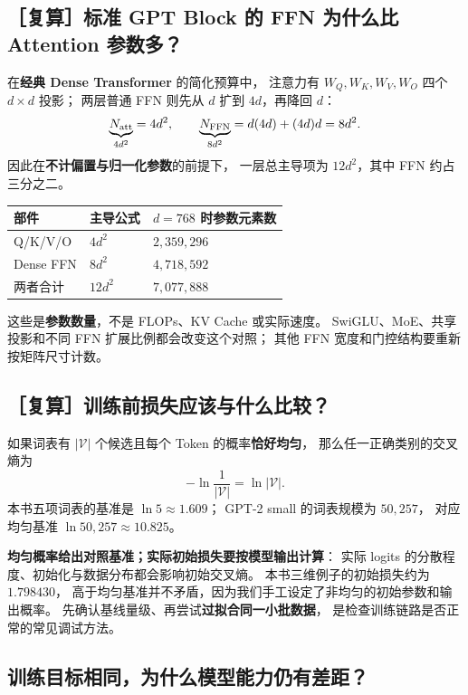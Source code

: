 \subsection{［复算］标准 GPT Block 的 FFN 为什么比 Attention 参数多？}

在\textbf{经典 Dense Transformer} 的简化预算中，
注意力有 $W_Q,W_K,W_V,W_O$ 四个 $d\times d$ 投影；
两层普通 FFN 则先从 $d$ 扩到 $4d$，再降回 $d$：
\[
\underbrace{N_{\rm att}}_{4d^2}=4d^2,\qquad
\underbrace{N_{\rm FFN}}_{8d^2}=d(4d)+(4d)d=8d^2.
\]
因此在\textbf{不计偏置与归一化参数}的前提下，
一层总主导项为 $12d^2$，其中 FFN 约占三分之二。

\begin{center}\small
{}
\begin{tabularx}{\linewidth}{@{}p{24mm}p{28mm}X@{}}
\toprule
部件 & 主导公式 & $d=768$ 时参数元素数\\\midrule
Q/K/V/O & $4d^2$ & $2{,}359{,}296$\\
Dense FFN & $8d^2$ & $4{,}718{,}592$\\
两者合计 & $12d^2$ & $7{,}077{,}888$\\
\bottomrule
\end{tabularx}
\end{center}
这些是\textbf{参数数量}，不是 FLOPs、KV Cache 或实际速度。
SwiGLU、MoE、共享投影和不同 FFN 扩展比例都会改变这个对照；
其他 FFN 宽度和门控结构要重新按矩阵尺寸计数。


\subsection{［复算］训练前损失应该与什么比较？}

如果词表有 $|\mathcal V|$ 个候选且每个 Token 的概率\textbf{恰好均匀}，
那么任一正确类别的交叉熵为
\[
-\ln\frac1{|\mathcal V|}=\ln|\mathcal V|.
\]
本书五项词表的基准是
$\ln5\approx\boxed{1.609}$；
GPT-2 small 的词表规模为 $50{,}257$，
对应均匀基准 $\ln 50{,}257\approx\boxed{10.825}$。

\textbf{均匀概率给出对照基准；实际初始损失要按模型输出计算}：
实际 logits 的分散程度、初始化与数据分布都会影响初始交叉熵。
本书三维例子的初始损失约为 $1.798430$，
高于均匀基准并不矛盾，因为我们手工设定了非均匀的初始参数和输出概率。
先确认基线量级、再尝试\textbf{过拟合同一小批数据}，
是检查训练链路是否正常的常见调试方法。

\subsection{训练目标相同，为什么模型能力仍有差距？}

